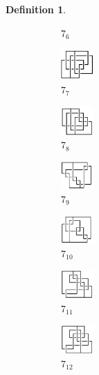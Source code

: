 \documentclass{article}
\theoremstyle{definition}
\newtheorem{defn}[thm]{Definition}
\theoremstyle{theorem}
\theoremstyle{proposition}
\theoremstyle{corollary}
\begin{document}
\begin{defn}
\begin{figure}[H]
\begin{subfigure}{0.075\textwidth}
    \caption{$7_{6}$} 
    \end{subfigure}
    \begin{subfigure}{0.075\textwidth}
    \includegraphics[width=1.25cm]{../Midterm_Poster/grid_diagram/theta_7_7.png}
    \caption{$7_{7}$} 
    \end{subfigure}
    \begin{subfigure}{0.075\textwidth}
    \includegraphics[width=1.25cm]{../Midterm_Poster/grid_diagram/theta_7_8.png}
    \caption{$7_{8}$} 
    \end{subfigure}
    \begin{subfigure}{0.075\textwidth}
    \includegraphics[width=1.25cm]{../Midterm_Poster/grid_diagram/theta_7_9.png}
    \caption{$7_{9}$} 
    \end{subfigure}
    \begin{subfigure}{0.075\textwidth}
    \includegraphics[width=1.25cm]{../Midterm_Poster/grid_diagram/theta_7_10.png}
    \caption{$7_{10}$} 
    \end{subfigure}
    \begin{subfigure}{0.075\textwidth}
    \includegraphics[width=1.25cm]{../Midterm_Poster/grid_diagram/theta_7_11.png}
    \caption{$7_{11}$} 
    \end{subfigure}
    \begin{subfigure}{0.075\textwidth}
    \includegraphics[width=1.25cm]{../Midterm_Poster/grid_diagram/theta_7_12.png}
    \caption{$7_{12}$} 
    \end{subfigure}
    \begin{subfigure}{0.075\textwidth}

\end{subfigure}
\end{figure}
\end{defn}
\end{document}
